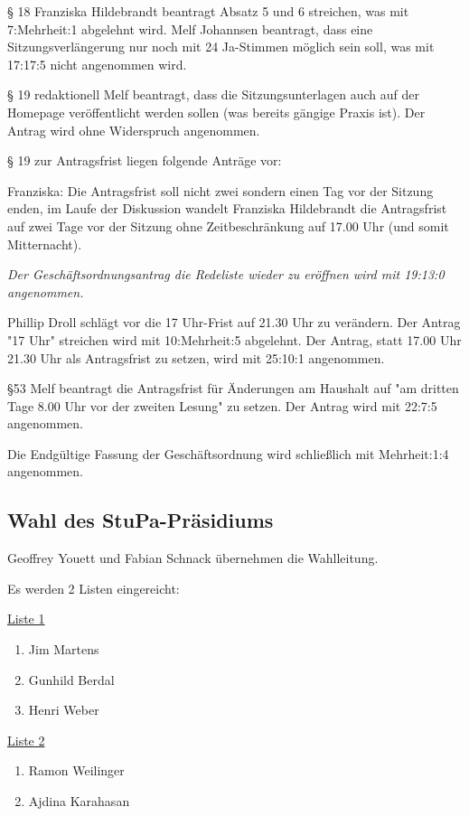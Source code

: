 \documentclass[ngerman,headheight=70pt]{scrartcl}
\begin{document}
    § 18  Franziska Hildebrandt beantragt Absatz 5 und 6 streichen, was mit
    7:Mehrheit:1 abgelehnt wird.
    Melf Johannsen beantragt, dass eine Sitzungsverlängerung nur noch mit 24
    Ja-Stimmen möglich sein soll, was mit 17:17:5 nicht angenommen wird.

    § 19 redaktionell Melf beantragt, dass die Sitzungsunterlagen auch auf der
    Homepage veröffentlicht werden sollen (was bereits gängige Praxis ist). Der
    Antrag wird ohne Widerspruch angenommen.

    § 19 zur Antragsfrist liegen folgende Anträge vor:

    Franziska: Die Antragsfrist soll nicht zwei sondern einen Tag vor der Sitzung
    enden, im Laufe der Diskussion wandelt Franziska Hildebrandt die Antragsfrist
    auf zwei Tage vor der Sitzung ohne Zeitbeschränkung auf 17.00 Uhr (und
    somit Mitternacht).

    \textit{Der Geschäftsordnungsantrag die Redeliste wieder zu eröffnen wird mit
    19:13:0 angenommen.}

    Phillip Droll schlägt vor die 17 Uhr-Frist auf 21.30 Uhr zu verändern.
    Der Antrag "17 Uhr" streichen wird mit 10:Mehrheit:5 abgelehnt.
    Der Antrag, statt 17.00 Uhr 21.30 Uhr als Antragsfrist zu setzen, wird mit
    25:10:1 angenommen.

    §53 Melf beantragt die Antragsfrist für Änderungen am Haushalt auf
    "am dritten Tage 8.00 Uhr vor der zweiten Lesung" zu setzen. Der Antrag wird
    mit 22:7:5 angenommen.

    Die Endgültige Fassung der Geschäftsordnung wird schließlich mit
    Mehrheit:1:4 angenommen.

    \subsection{Wahl des StuPa-Präsidiums}

    Geoffrey Youett und Fabian Schnack übernehmen die Wahlleitung.

    Es werden 2 Listen eingereicht:

    \underline{Liste 1}
    \begin{enumerate}
        \item Jim Martens
        \item Gunhild Berdal
        \item Henri Weber
    \end{enumerate}

    \underline{Liste 2}
    \begin{enumerate}
        \item Ramon Weilinger
        \item Ajdina Karahasan
    \end{enumerate}
\end{document}
